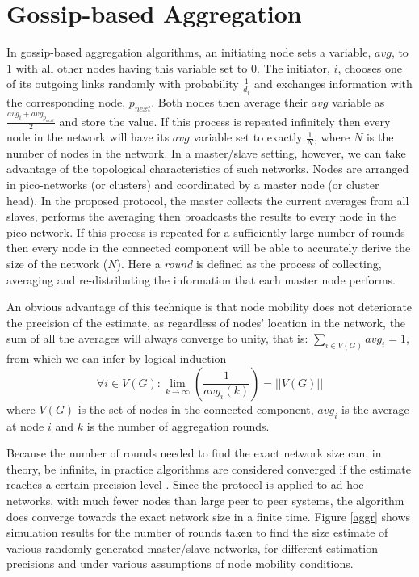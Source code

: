 \documentclass[twocolumn,10pt,conference]{IEEEtran}
\begin{document}
\section{Gossip-based Aggregation}
In gossip-based aggregation algorithms, an initiating node sets a variable, $avg$, to $1$ with all other nodes having this 
variable set to $0$. The initiator, $i$, chooses one of its outgoing links randomly with probability $\frac{1}{d_i}$ and 
exchanges information with the corresponding node, $p_{next}$. Both nodes then average their $avg$ variable as 
$\frac{avg_i+avg_{p_{next}}}{2}$ and store the value. If this process is repeated infinitely then every node in the network 
will have its $avg$ variable set to exactly $\frac{1}{N}$, where $N$ is the number of nodes in the network.
In a master/slave setting, however, we can take advantage of the topological characteristics of such networks. Nodes are 
arranged in pico-networks (or clusters) and coordinated by a master node (or cluster head). In the proposed protocol,
the master collects the current averages from all slaves, performs the averaging then broadcasts the results to every node 
in the pico-network. If this process is repeated for a sufficiently large number of rounds then every node in the connected 
component will be able to accurately derive the size of the network ($N$). Here a \textit{round} is defined as the process of 
collecting, averaging and re-distributing the information that each master node performs.  

An obvious advantage of this technique is that node mobility does not deteriorate the precision of the estimate, as 
regardless of nodes' location in the network, the sum of all the averages will always converge to unity, that is: 
$\sum_{i\in{V(G)}}{avg_i}=1$, from which we can infer by logical induction
\begin{equation}
 \forall{i}\in{V(G)}:\lim_{k\rightarrow \infty}\left(\frac{1}{avg_i(k)}\right)=||V(G)||
\end{equation}
where $V(G)$ is the set of nodes in the connected component, $avg_i$ is the average at node $i$ and $k$ is the number of 
aggregation rounds.

Because the number of rounds needed to find the exact network size can, in theory, be infinite, in practice algorithms are 
considered converged if the estimate reaches a certain precision level \cite{ref21}. Since the protocol is applied to 
ad hoc networks, with much fewer nodes than large peer to peer systems, the algorithm does converge towards the exact 
network size in a finite time. Figure \ref{aggr} shows simulation results for the number of rounds taken to find the size estimate 
of various randomly generated master/slave networks, for different estimation precisions and under various assumptions of 
node mobility conditions.
\end{document}
